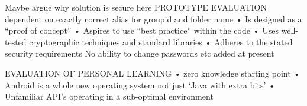 Maybe argue why solution is secure here
PROTOTYPE EVALUATION
dependent on exactly correct alias for groupid and folder name
• Is designed as a “proof of concept”
• Aspires to use “best practice” within the code 
• Uses well-tested cryptographic techniques and standard libraries
• Adheres to the stated security requirements 
No ability to change passwords etc added at present

EVALUATION OF PERSONAL LEARNING 
• zero knowledge starting point 
• Android is a whole new operating system not just ‘Java with extra bits’
• Unfamiliar API’s operating in a sub-optimal environment 


